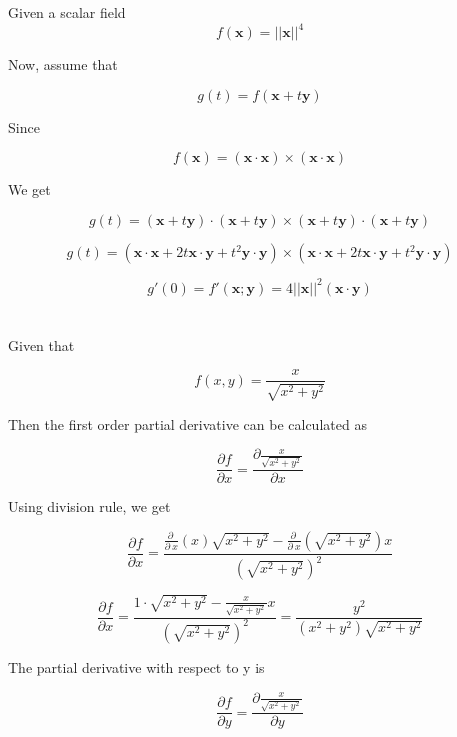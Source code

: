 \documentclass[11pt]{article}
\begin{document}
\section{}
Given a scalar field
$$f(\textbf{x}) = ||\textbf{x}||^{4}$$

Now, assume that

$$g(t) = f(\textbf{x} + t\textbf{y})$$

Since

$$f(\textbf{x}) = (\textbf{x}\cdot\textbf{x})\times(\textbf{x}\cdot\textbf{x})$$

We get

$$g(t) = (\textbf{x} + t\textbf{y})\cdot(\textbf{x} + t\textbf{y})\times(\textbf{x} + t\textbf{y})\cdot(\textbf{x} + t\textbf{y})$$

$$g(t) = (\textbf{x}\cdot\textbf{x}+2t\textbf{x}\cdot\textbf{y}+t^{2}\textbf{y}\cdot\textbf{y})\times(\textbf{x}\cdot\textbf{x}+2t\textbf{x}\cdot\textbf{y}+t^{2}\textbf{y}\cdot\textbf{y})$$

$$g\prime(0) = f\prime(\textbf{x};\textbf{y}) = 4||\textbf{x}||^{2}(\textbf{x}\cdot\textbf{y})$$

\section{}
\subsection{}

Given that

$$f(x,y) = \frac{x}{\sqrt{x^{2} + y^{2}}}$$

Then the first order partial derivative can be calculated as

$$\frac{\partial f}{\partial x} = \frac{\partial \frac{x}{\sqrt{x^{2} + y^{2}}}}{\partial x}$$

Using division rule, we get

$$\frac{\partial f}{\partial x} = \frac{\frac{\partial \:}{\partial \:x}\left(x\right)\sqrt{x^2+y^2}-\frac{\partial \:}{\partial \:x}\left(\sqrt{x^2+y^2}\right)x}{\left(\sqrt{x^2+y^2}\right)^2}$$

$$\frac{\partial f}{\partial x} = \frac{1\cdot \sqrt{x^2+y^2}-\frac{x}{\sqrt{x^2+y^2}}x}{\left(\sqrt{x^2+y^2}\right)^2} = \frac{y^2}{\left(x^2+y^2\right)\sqrt{x^2+y^2}}$$

The partial derivative with respect to y is

$$\frac{\partial f}{\partial y} = \frac{\partial \frac{x}{\sqrt{x^{2} + y^{2}}}}{\partial y}$$
\end{document}
